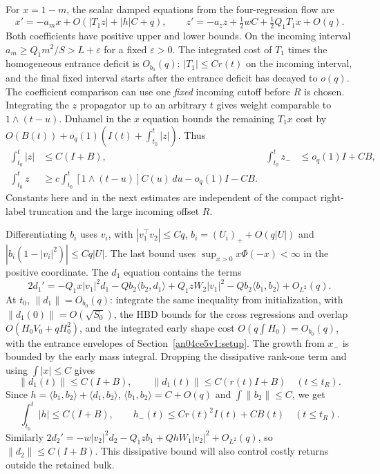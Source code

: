 \documentclass[11pt]{article}
\newcommand{\eps}{\varepsilon}
\newcommand{\norm}[1]{\lVert #1\rVert}
\begin{document}
For $x=1-m$, the scalar damped equations from the four-regression flow are
\[
 x'=-a_m x+O(|T_1 z|+|h|C+q),\qquad
 z'=-a_z z+\tfrac12 w C+\tfrac12 Q_1T_1 x+O(q).
\]
Both coefficients have positive upper and lower bounds. On the incoming
interval $a_m\ge Q_1m^2/S>L+\eps$ for a fixed $\eps>0$.
The integrated cost of $T_1$ times the homogeneous entrance deficit
is $O_{b_0}(q)$: $|T_1|\le Cr(t)$ on the incoming interval, and the final
fixed interval starts after the entrance deficit has decayed to $o(q)$.
The coefficient comparison can use one \emph{fixed} incoming cutoff
before $R$ is chosen. Integrating the $z$ propagator up to an arbitrary
$t$ gives weight comparable to $1\wedge(t-u)$. Duhamel in the $x$
equation bounds the remaining $T_1x$ cost by
$O(B(t))+o_q(1)(I(t)+\int_{t_0}^t |z|)$. Thus
\begin{align}
 \int_{t_0}^t |z|&\le C(I+B),&
 \int_{t_0}^t z_-&\le o_q(1) I+CB, \nonumber\\
 \int_{t_0}^t z&\ge c\int_{t_0}^t[1\wedge(t-u)]C(u)\,du-o_q(1)I-CB.
 \label{an04ce5v1:prefix}
\end{align}
Constants here and in the next estimates are independent of the compact
right-label truncation and the large incoming offset $R$.

Differentiating $b_i$ uses $v_i$, with $|v_1^\top v_2|\le Cq$,
$b_i=(U_i)_++O(q|U|)$ and
$|b_i(1-|v_i|^2)|\le Cq|U|$. The last bound uses
$\sup_{x>0}x\Phi(-x)<\infty$ in the positive coordinate.
The $d_1$ equation contains the terms
\[
 2d_1'=-Q_1x|v_1|^2d_1-Qb_2\langle b_2,d_1\rangle+
 Q_1 z W_2 |v_1|^2-Qb_2\langle b_1,b_2\rangle+O_{L^2}(q).
\]
At $t_0$, $\norm{d_1}=O_{b_0}(q)$: integrate the same inequality from
initialization, with $\norm{d_1(0)}=O(\sqrt{S_0})$, the HBD bounds for
the cross regressions and overlap $O(H_0V_0+qH_0^2)$, and the integrated
early shape cost $O(q\int H_0)=O_{b_0}(q)$, with the entrance envelopes of Section~\ref{an04ce5v1:setup}. The growth from $x_-$ is bounded by the early mass integral.
Dropping the dissipative rank-one term and using $\int |x|\le C$ gives
\[
 \norm{d_1(t)}\le C(I+B),\qquad
 \norm{d_1(t)}\le C(r(t)I+B)\quad(t\le t_R).
\]
Since $h=\langle b_1,b_2\rangle+\langle d_1,b_2\rangle$,
$\langle b_1,b_2\rangle=C+O(q)$ and $\int\norm{b_2}\le C$, we get
\begin{equation}
 \int_{t_0}^t|h|\le C(I+B),\qquad
 h_-(t)\le C r(t)^2 I(t)+C B(t)\quad(t\le t_R).
 \label{an04ce5v1:earlyh}
\end{equation}
Similarly $2d_2'=-w|v_2|^2d_2-Q_1zb_1+QhW_1|v_2|^2+O_{L^2}(q)$, so
$\norm{d_2}\le C(I+B)$. This dissipative bound will also control costly
returns outside the retained bulk.
\end{document}
